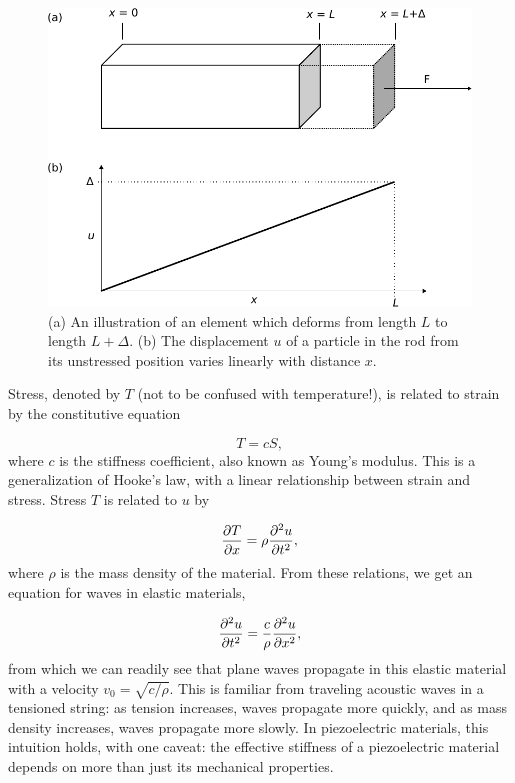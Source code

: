 \documentclass{beavtex_dub_edit}
\begin{document}
\begin{figure}
    \includegraphics[width = 1\textwidth]{displacement field.pdf}
    \caption{(a) An illustration of an element which deforms from length $L$ to length $L + \Delta$. (b) The displacement $u$ of a particle in the rod from its unstressed position varies linearly with distance $x$.} \label{dfield}
\end{figure}
Stress, denoted by $T$ (not to be confused with temperature!), is related to strain by the constitutive equation

\begin{equation}
    T = cS, \label{elastic Hooke's}
\end{equation}
where $c$ is the stiffness coefficient, also known as Young's modulus. This is a generalization of Hooke's law, with a linear relationship between strain and stress. Stress $T$ is related to $u$ by 

\begin{equation}
    \pdv{T}{x} = \rho \pdv[2]{u}{t}, \label{stress related to displacement}
\end{equation}
where $\rho$ is the mass density of the material. From these relations, we get an equation for waves in elastic materials,

\begin{equation}
    \pdv[2]{u}{t} = \frac{c}{\rho} \pdv[2]{u}{x},
\end{equation}
from which we can readily see that plane waves propagate in this elastic material with a velocity $v_0 = \sqrt{c/\rho}$. This is familiar from traveling acoustic waves in a tensioned string: as tension increases, waves propagate more quickly, and as mass density increases, waves propagate more slowly. In piezoelectric materials, this intuition holds, with one caveat: the effective stiffness of a piezoelectric material depends on more than just its mechanical properties.
\end{document}
